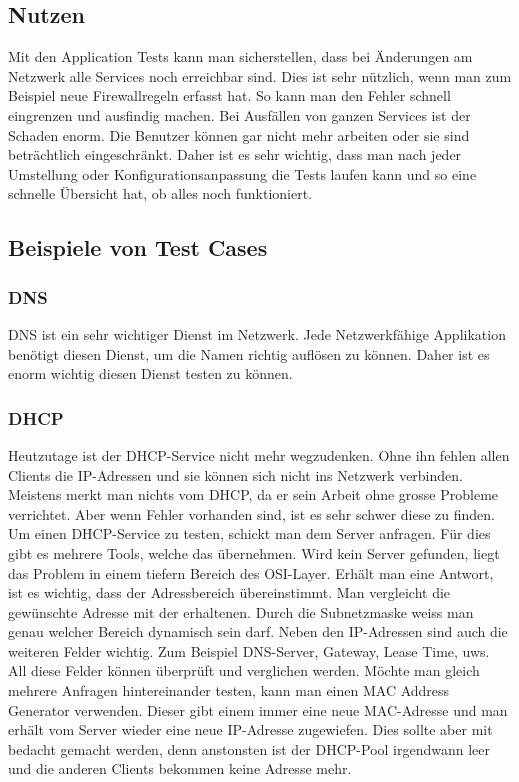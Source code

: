 \documentclass[a4,12pt]{scrartcl}
\begin{document}
\subsection{Nutzen}
Mit den Application Tests kann man sicherstellen, dass bei Änderungen am Netzwerk alle Services noch erreichbar sind. Dies ist sehr nützlich, wenn man zum Beispiel neue Firewallregeln erfasst hat. So kann man den Fehler schnell eingrenzen und ausfindig machen.\newline
Bei Ausfällen von ganzen Services ist der Schaden enorm. Die Benutzer können gar nicht mehr arbeiten oder sie sind beträchtlich eingeschränkt. Daher ist es sehr wichtig, dass man nach jeder Umstellung oder Konfigurationsanpassung die Tests laufen kann und so eine schnelle Übersicht hat, ob alles noch funktioniert.

\subsection{Beispiele von Test Cases}
\subsubsection{DNS}
DNS ist ein sehr wichtiger Dienst im Netzwerk. Jede Netzwerkfähige Applikation benötigt diesen Dienst, um die Namen richtig auflösen zu können. Daher ist es enorm wichtig diesen Dienst testen zu können.

\subsubsection{DHCP}
Heutzutage ist der DHCP-Service nicht mehr wegzudenken. Ohne ihn fehlen allen Clients die IP-Adressen und sie können sich nicht ins Netzwerk verbinden. Meistens merkt man nichts vom DHCP, da er sein Arbeit ohne grosse Probleme verrichtet. Aber wenn Fehler vorhanden sind, ist es sehr schwer diese zu finden. \newline\newline
Um einen DHCP-Service zu testen, schickt man dem Server anfragen. Für dies gibt es mehrere Tools, welche das übernehmen. Wird kein Server gefunden, liegt das Problem in einem tiefern Bereich des OSI-Layer.\newline
Erhält man eine Antwort, ist es wichtig, dass der Adressbereich übereinstimmt. Man vergleicht die gewünschte Adresse mit der erhaltenen. Durch die Subnetzmaske weiss man genau welcher Bereich dynamisch sein darf. Neben den IP-Adressen sind auch die weiteren Felder wichtig. Zum Beispiel DNS-Server, Gateway, Lease Time, uws. All diese Felder können überprüft und verglichen werden.\newline\newline
Möchte man gleich mehrere Anfragen hintereinander testen, kann man einen MAC Address Generator verwenden. Dieser gibt einem immer eine neue MAC-Adresse und man erhält vom Server wieder eine neue IP-Adresse zugewiefen. Dies sollte aber mit bedacht gemacht werden, denn anstonsten ist der DHCP-Pool irgendwann  leer und die anderen Clients bekommen keine Adresse mehr. 
\end{document}
